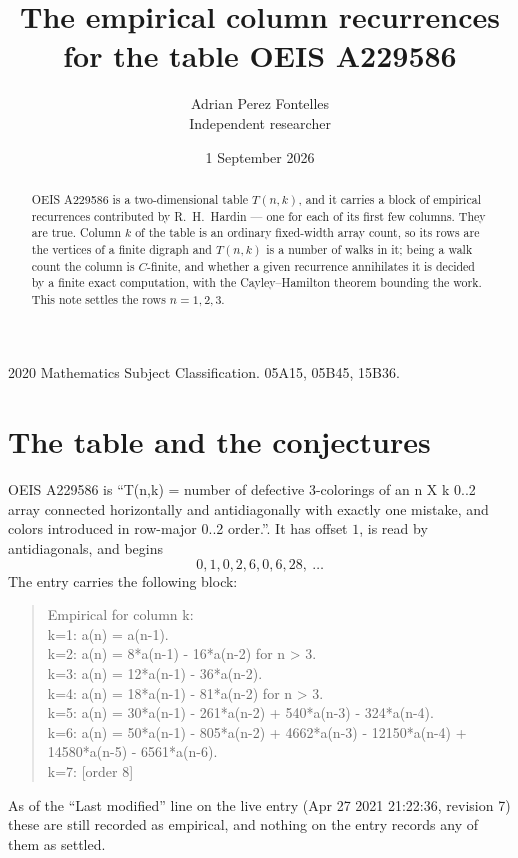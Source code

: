 \documentclass[11pt,a4paper]{article}
\title{The empirical column recurrences for the table OEIS A229586}
\author{Adrian Perez Fontelles\\ \small Independent researcher}
\date{1 September 2026}
\theoremstyle{plain}
\theoremstyle{definition}
\begin{document}
\maketitle

\begin{abstract}
OEIS A229586 is a two-dimensional table $T(n,k)$, and it carries a block of empirical
recurrences contributed by R.~H.~Hardin --- one for each of its first few columns. They are
true. Column $k$ of the table is an ordinary fixed-width array count, so its rows are the
vertices of a finite digraph and $T(n,k)$ is a number of walks in it; being a walk count the
column is $C$-finite, and whether a given recurrence annihilates it is decided by a finite
exact computation, with the Cayley--Hamilton theorem bounding the work. This note settles the rows $n=1, 2, 3$.
\end{abstract}

\noindent\small 2020 Mathematics Subject Classification. 05A15, 05B45, 15B36.\normalsize

\section{The table and the conjectures}

OEIS A229586 is ``T(n,k) = number of defective 3-colorings of an n X k 0..2 array connected horizontally and antidiagonally with exactly one mistake, and colors introduced in row-major 0..2 order.''. It has offset $1$, is
read by antidiagonals, and begins
\[
0, 1, 0, 2, 6, 0, 6, 28,\ \dots
\]
The entry carries the following block:
\begin{quote}\small
Empirical for column k:\\
k=1: a(n) = a(n-1).\\
k=2: a(n) = 8*a(n-1) - 16*a(n-2) for n > 3.\\
k=3: a(n) = 12*a(n-1) - 36*a(n-2).\\
k=4: a(n) = 18*a(n-1) - 81*a(n-2) for n > 3.\\
k=5: a(n) = 30*a(n-1) - 261*a(n-2) + 540*a(n-3) - 324*a(n-4).\\
k=6: a(n) = 50*a(n-1) - 805*a(n-2) + 4662*a(n-3) - 12150*a(n-4) + 14580*a(n-5) - 6561*a(n-6).\\
k=7: [order 8]\\
\end{quote}
As of the ``Last modified'' line on the live entry (Apr 27 2021 21:22:36, revision 7) these are still
recorded as empirical, and nothing on the entry records any of them as settled.
\end{document}
